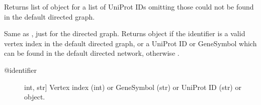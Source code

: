 \documentclass[letterpaper,10pt,english]{sphinxmanual}
\begin{document}
\begin{fulllineitems}
\begin{fulllineitems}
\begin{description}
\end{description}

\end{fulllineitems}


\begin{fulllineitems}
\label{\detokenize{reference:pypath.main.PyPath.dups}}
Returns list of  object
for a list of UniProt IDs omitting those
could not be found in the default
directed graph.

\end{fulllineitems}


\begin{fulllineitems}
\label{\detokenize{reference:pypath.main.PyPath.dv}}
Same as , just for the directed graph.
Returns  object if the identifier
is a valid vertex index in the default directed graph,
or a UniProt ID or GeneSymbol which can be found in the
default directed network, otherwise .
\begin{description}
\item[{@identifier}] \leavevmode{[}int, str{]}
Vertex index (int) or GeneSymbol (str) or UniProt ID (str) or
 object.

\end{description}

\end{fulllineitems}


\begin{fulllineitems}
\label{\detokenize{reference:pypath.main.PyPath.dvs}}
\end{fulllineitems}



\end{fulllineitems}
\end{document}
